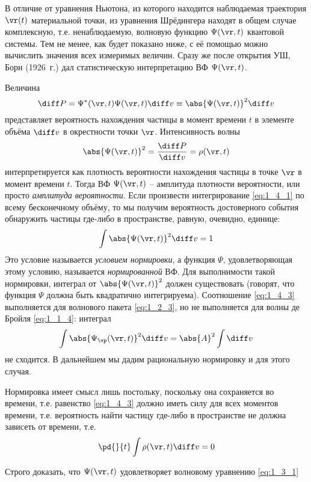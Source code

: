 В отличие от уравнения Ньютона\footnotemark{}, из которого находится наблюдаемая траектория $\vr(t)$ материальной точки, из уравнения Шрёдингера находят в общем случае комплексную, т.е. ненаблюдаемую, волновую функцию $\Psi(\vr, t)$ квантовой системы. Тем не менее, как будет показано ниже, с её помощью можно вычислить значения всех измеримых величин. Сразу же после открытия УШ, Борн\footnotemark{} (1926~г.) дал статистическую интерпретацию ВФ $\Psi(\vr, t)$.

Величина
\begin{equation}
\label{eq:1_4_1}
\diff P = \Psi^*(\vr,t) \Psi(\vr,t) \diff v \equiv \abs{\Psi(\vr,t)}^2\diff v
\end{equation}%
%
представляет вероятность нахождения частицы в момент времени $t$ в элементе объёма $\diff v$ в окрестности точки $\vr$. Интенсивность волны
\begin{equation}
\label{eq:1_4_2}
\abs{\Psi(\vr,t)}^2 = \frac{\diff P}{\diff v} = \rho(\vr,t)
\end{equation}%
%
интерпретируется как плотность вероятности нахождения частицы в точке $\vr$ в момент времени $t$. Тогда ВФ $\Psi(\vr, t)$ -- амплитуда плотности вероятности, или просто {\em амплитуда вероятности}. Если произвести интегрирование \eqref{eq:1_4_1} по всему бесконечному объёму, то мы получим вероятность достоверного события обнаружить частицы где-либо в пространстве, равную, очевидно, единице:
\begin{equation}
\label{eq:1_4_3}
\int \abs{\Psi(\vr,t)}^2 \diff v = 1
\end{equation}
Это условие называется {\em условием нормировки}, а функция $\Psi$, удовлетворяющая этому условию, называется {\em нормированной} ВФ. Для выполнимости такой нормировки, интеграл от $\abs{\Psi(\vr,t)}^2$ должен существовать (говорят, что функция $\Psi$ должна быть квадратично интегрируема). Соотношение \eqref{eq:1_4_3} выполняется для волнового пакета \eqref{eq:1_2_3}, но не выполняется для волны де Бройля \eqref{eq:1_1_4}: интеграл
$$
\int \abs{\Psi_{\vp}(\vr,t)}^2 \diff v = \abs{A}^2 \int \diff v
$$
не сходится. В дальнейшем мы дадим рациональную нормировку и для этого случая.

Нормировка имеет смысл лишь постольку, поскольку она сохраняется во времени, т.е. равенство \eqref{eq:1_4_3} должно иметь силу для всех моментов времени, т.е. вероятность найти частицу где-либо в пространстве не должна зависеть от времени, т.е.
$$
\pd{}{t} \int \rho(\vr,t) \diff v = 0
$$
\begin{excr}
Строго доказать, что $\Psi(\vr,t)$ удовлетворяет волновому уравнению \eqref{eq:1_3_1}
\end{excr}

